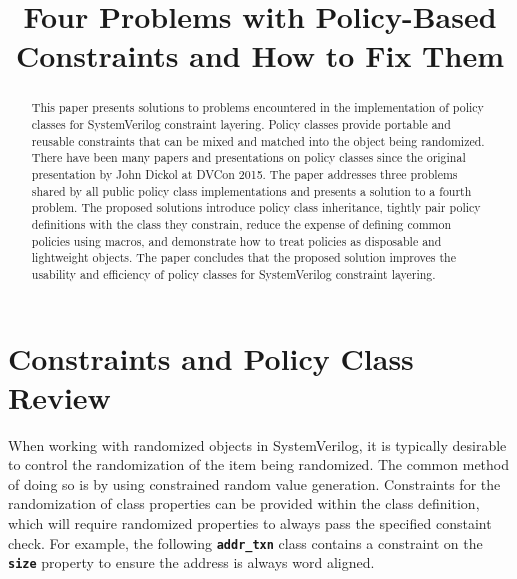 \documentclass[conference,onecolumn]{IEEEtran}
\newcommand{\code}[1]{
\textbf{\texttt{#1}}
}
\begin{document}
\title{Four Problems with Policy-Based Constraints and How to Fix Them}

\author{
    \and
}

\maketitle

\thispagestyle{plain}
\pagestyle{plain}

\begin{abstract}
    This paper presents solutions to problems encountered in the implementation of policy classes for SystemVerilog constraint layering. Policy classes provide portable and reusable constraints that can be mixed and matched into the object being randomized. There have been many papers and presentations on policy classes since the original presentation by John Dickol at DVCon 2015. The paper addresses three problems shared by all public policy class implementations and presents a solution to a fourth problem. The proposed solutions introduce policy class inheritance, tightly pair policy definitions with the class they constrain, reduce the expense of defining common policies using macros, and demonstrate how to treat policies as disposable and lightweight objects. The paper concludes that the proposed solution improves the usability and efficiency of policy classes for SystemVerilog constraint layering.
\end{abstract}

\section{Constraints and Policy Class Review}

When working with randomized objects in SystemVerilog, it is typically desirable to control the randomization of the item being randomized. The common method of doing so is by using constrained random value generation. Constraints for the randomization of class properties can be provided within the class definition, which will require randomized properties to always pass the specified constaint check. For example, the following \code{addr_txn} class contains a constraint on the \code{size} property to ensure the address is always word aligned.
\end{document}
